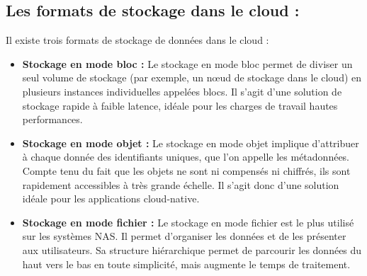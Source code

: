 \subsection{Les formats de stockage dans le cloud : }
Il existe trois formats de stockage de données dans le cloud :

\begin{itemize}[label=\textbullet]
\item \textbf{Stockage en mode bloc :} Le stockage en mode bloc permet de diviser un seul volume de stockage (par exemple, un nœud de stockage dans le cloud) en plusieurs instances individuelles appelées blocs. Il s'agit d'une solution de stockage rapide à faible latence, idéale pour les charges de travail hautes performances.
\item \textbf{Stockage en mode objet :} Le stockage en mode objet implique d'attribuer à chaque donnée des identifiants uniques, que l'on appelle les métadonnées. Compte tenu du fait que les objets ne sont ni compensés ni chiffrés, ils sont rapidement accessibles à très grande échelle. Il s'agit donc d'une solution idéale pour les applications cloud-native.
\item \textbf{Stockage en mode fichier :} Le stockage en mode fichier est le plus utilisé sur les systèmes NAS. Il permet d'organiser les données et de les présenter aux utilisateurs. Sa structure hiérarchique permet de parcourir les données du haut vers le bas en toute simplicité, mais augmente le temps de traitement.
\end{itemize}